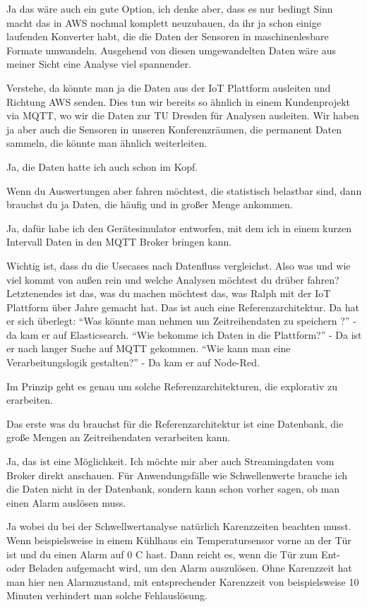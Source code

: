\LF Ja das wäre auch ein gute Option, ich denke aber, dass es nur bedingt Sinn macht das in \ac{AWS} nochmal komplett neuzubauen, da ihr ja schon einige laufenden Konverter habt, die die Daten der Sensoren in maschinenlesbare Formate umwandeln. Ausgehend von diesen umgewandelten Daten wäre aus meiner Sicht eine Analyse viel spannender.

\PE Verstehe, da könnte man ja die Daten aus der IoT Plattform ausleiten und Richtung \ac{AWS} senden. Dies tun wir bereits so ähnlich in einem Kundenprojekt via \ac{MQTT}, wo wir die Daten zur TU Dresden für Analysen ausleiten. Wir haben ja aber auch die \coo Sensoren in unseren Konferenzräumen, die permanent Daten sammeln, die könnte man ähnlich weiterleiten.

\LF Ja, die \coo Daten hatte ich auch schon im Kopf.

\PE Wenn du Auswertungen aber fahren möchtest, die statistisch belastbar sind, dann brauchst du ja Daten, die häufig und in großer Menge ankommen.

\LF Ja, dafür habe ich den Gerätesimulator entworfen, mit dem ich in einem kurzen Intervall Daten in den \ac{MQTT} Broker bringen kann. 

\PE Wichtig ist, dass du die Usecases nach Datenfluss vergleichst. Also was und wie viel kommt von außen rein und welche Analysen möchtest du drüber fahren? Letztenendes ist das, was du machen möchtest das, was Ralph mit der \ac{IoT} Plattform über Jahre gemacht hat. Das ist auch eine Referenzarchitektur. Da hat er sich überlegt: \enquote{Was könnte man nehmen um Zeitreihendaten zu speichern ?} - da kam er auf Elasticsearch. \enquote{Wie bekomme ich Daten in die Plattform?} - Da ist er nach langer Suche auf \ac{MQTT} gekommen. \enquote{Wie kann man eine Verarbeitungslogik gestalten?} - Da kam er auf Node-Red.

\LF Im Prinzip geht es genau um solche Referenzarchitekturen, die explorativ zu erarbeiten. 

\PE Das erste was du brauchst für die Referenzarchitektur ist eine Datenbank, die große Mengen an Zeitreihendaten verarbeiten kann.

\LF Ja, das ist eine Möglichkeit. Ich möchte mir aber auch Streamingdaten vom Broker direkt anschauen. Für Anwendungsfälle wie Schwellenwerte brauche ich die Daten nicht in der Datenbank, sondern kann schon vorher sagen, ob man einen Alarm auslösen muss.

\PE Ja wobei du bei der Schwellwertanalyse natürlich Karenzzeiten beachten musst. Wenn beispielsweise in einem Kühlhaus ein Temperatursensor vorne an der Tür ist und du einen Alarm auf 0 \textdegree{}C hast. Dann reicht es, wenn die Tür zum Ent- oder Beladen aufgemacht wird, um den Alarm auszulösen. Ohne Karenzzeit hat man hier nen Alarmzustand, mit entsprechender Karenzzeit von beispielsweise 10 Minuten verhindert man solche Fehlauslösung.

